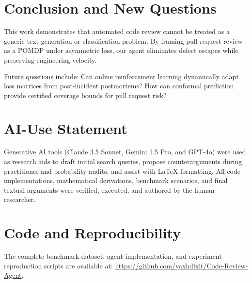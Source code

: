 \documentclass[10pt,twocolumn,letterpaper]{article}
\begin{document}
\section{Conclusion and New Questions}
This work demonstrates that automated code review cannot be treated as a generic text generation or classification problem. By framing pull request review as a POMDP under asymmetric loss, our agent eliminates defect escapes while preserving engineering velocity. 

Future questions include: Can online reinforcement learning dynamically adapt loss matrices from post-incident postmortems? How can conformal prediction provide certified coverage bounds for pull request risk?

\section*{AI-Use Statement}
Generative AI tools (Claude 3.5 Sonnet, Gemini 1.5 Pro, and GPT-4o) were used as research aids to draft initial search queries, propose counterarguments during practitioner and probability audits, and assist with LaTeX formatting. All code implementations, mathematical derivations, benchmark scenarios, and final textual arguments were verified, executed, and authored by the human researcher.

\section*{Code and Reproducibility}
The complete benchmark dataset, agent implementation, and experiment reproduction scripts are available at: \url{https://github.com/yaxhdixit/Code-Review-Agent}.



\end{document}
